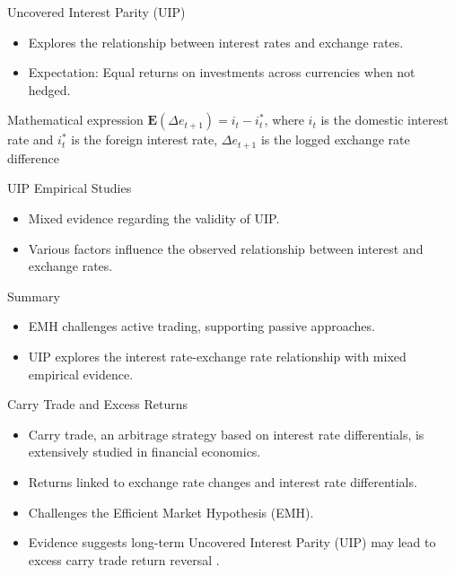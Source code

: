 \documentclass{beamer}
\begin{document}
\begin{frame}{Uncovered Interest Parity (UIP)}
    \begin{itemize}
        \item Explores the relationship between interest rates and exchange rates.
        \item Expectation: Equal returns on investments across currencies when not hedged.
    \end{itemize}

    \begin{block}{Mathematical expression}
    \( \mathbf{E}(\Delta e_{t+1}) = i_t - i^*_t \), where $i_t$ is the domestic interest rate and $i^*_t$ is the foreign interest rate, $\Delta e_{t+1}$ is the logged exchange rate difference
    \end{block}
\end{frame}

\begin{frame}{UIP Empirical Studies}
    \begin{itemize}
        \item Mixed evidence regarding the validity of UIP.
        \item Various factors influence the observed relationship between interest and exchange rates.
    \end{itemize}
\end{frame}

\begin{frame}{Summary}
    \begin{itemize}
        \item EMH challenges active trading, supporting passive approaches.
        \item UIP explores the interest rate-exchange rate relationship with mixed empirical evidence.
    \end{itemize}
\end{frame}

\begin{frame}{Carry Trade and Excess Returns}
    \begin{itemize}
        \item Carry trade, an arbitrage strategy based on interest rate differentials, is extensively studied in financial economics.
        \item Returns linked to exchange rate changes and interest rate differentials.
        \item Challenges the Efficient Market Hypothesis (EMH).
        \item Evidence suggests long-term Uncovered Interest Parity (UIP) may lead to excess carry trade return reversal \cite{wang2021machine}.
    \end{itemize}
\end{frame}
\end{document}
